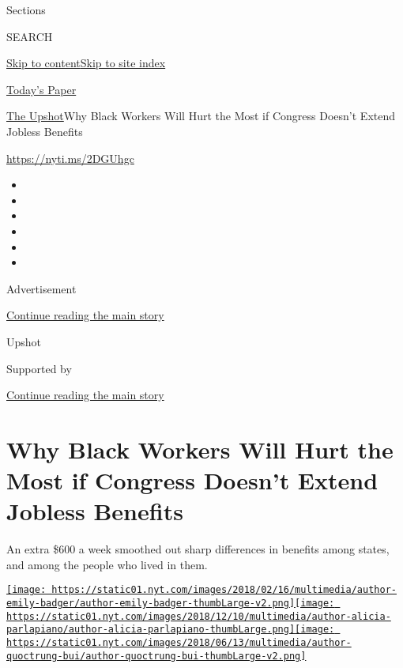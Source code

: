 Sections

SEARCH

\protect\hyperlink{site-content}{Skip to
content}\protect\hyperlink{site-index}{Skip to site index}

\href{https://myaccount.nytimes.com/auth/login?response_type=cookie\&client_id=vi}{}

\href{https://www.nytimes.com/section/todayspaper}{Today's Paper}

\href{/section/upshot}{The Upshot}\textbar{}Why Black Workers Will Hurt
the Most if Congress Doesn't Extend Jobless Benefits

\href{https://nyti.ms/2DGUhgc}{https://nyti.ms/2DGUhgc}

\begin{itemize}
\item
\item
\item
\item
\item
\item
\end{itemize}

Advertisement

\protect\hyperlink{after-top}{Continue reading the main story}

Upshot

Supported by

\protect\hyperlink{after-sponsor}{Continue reading the main story}

\hypertarget{why-black-workers-will-hurt-the-most-if-congress-doesnt-extend-jobless-benefits}{%
\section{Why Black Workers Will Hurt the Most if Congress Doesn't Extend
Jobless
Benefits}\label{why-black-workers-will-hurt-the-most-if-congress-doesnt-extend-jobless-benefits}}

An extra \$600 a week smoothed out sharp differences in benefits among
states, and among the people who lived in them.

\href{https://www.nytimes.com/by/emily-badger}{\texttt{[image: https://static01.nyt.com/images/2018/02/16/multimedia/author-emily-badger/author-emily-badger-thumbLarge-v2.png]}}\href{https://www.nytimes.com/by/alicia-parlapiano}{\texttt{[image: https://static01.nyt.com/images/2018/12/10/multimedia/author-alicia-parlapiano/author-alicia-parlapiano-thumbLarge.png]}}\href{https://www.nytimes.com/by/quoctrung-bui}{\texttt{[image: https://static01.nyt.com/images/2018/06/13/multimedia/author-quoctrung-bui/author-quoctrung-bui-thumbLarge-v2.png]}}

